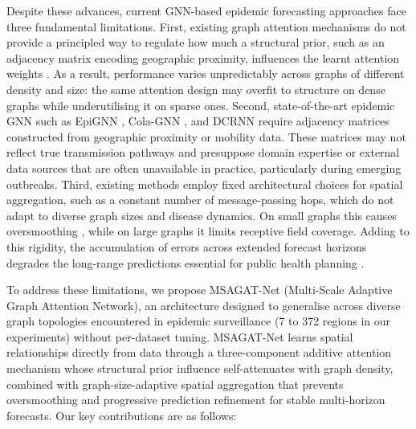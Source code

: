 \documentclass[final,1p,times]{elsarticle}
\begin{document}
Despite these advances, current GNN-based epidemic forecasting approaches face three fundamental limitations. First, existing graph attention mechanisms do not provide a principled way to regulate how much a structural prior, such as an adjacency matrix encoding geographic proximity, influences the learnt attention weights \cite{velickovic2017graph}. As a result, performance varies unpredictably across graphs of different density and size: the same attention design may overfit to structure on dense graphs while underutilising it on sparse ones. Second, state-of-the-art epidemic GNN such as EpiGNN \cite{xie2022epignn}, Cola-GNN \cite{dengColaGNNCrosslocationAttention2020a}, and DCRNN \cite{li2017diffusion} require adjacency matrices constructed from geographic proximity or mobility data. These matrices may not reflect true transmission pathways and presuppose domain expertise or external data sources that are often unavailable in practice, particularly during emerging outbreaks. Third, existing methods employ fixed architectural choices for spatial aggregation, such as a constant number of message-passing hops, which do not adapt to diverse graph sizes and disease dynamics. On small graphs this causes oversmoothing \cite{li2018deeper}, while on large graphs it limits receptive field coverage. Adding to this rigidity, the accumulation of errors across extended forecast horizons degrades the long-range predictions essential for public health planning \cite{Brooks2018Nonmechanistic}.

To address these limitations, we propose MSAGAT-Net (Multi-Scale Adaptive Graph Attention Network), an architecture designed to generalise across diverse graph topologies encountered in epidemic surveillance (7 to 372 regions in our experiments) without per-dataset tuning. MSAGAT-Net learns spatial relationships directly from data through a three-component additive attention mechanism whose structural prior influence self-attenuates with graph density, combined with graph-size-adaptive spatial aggregation that prevents oversmoothing and progressive prediction refinement for stable multi-horizon forecasts. Our key contributions are as follows:
 
\end{document}
